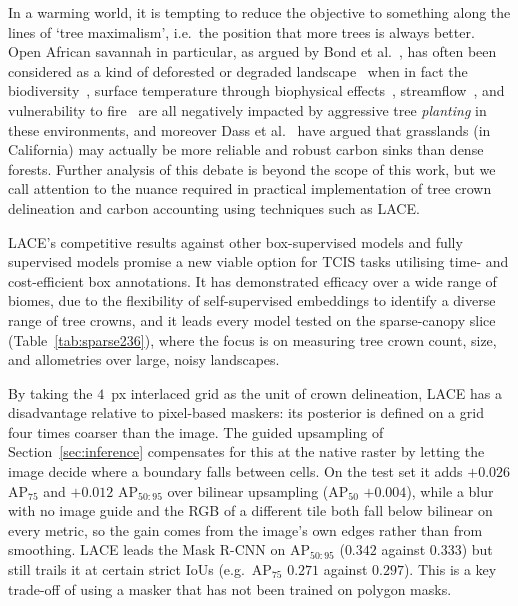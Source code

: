 \documentclass[remotesensing,article,submit,moreauthors]{Definitions/mdpi}
\begin{document}
In a warming world, it is tempting to reduce the objective to something along the lines of `tree maximalism', i.e.\ the position that more trees is always better. Open African savannah in particular, as argued by Bond et al.~\cite{bond2019}, has often been considered as a kind of deforested or degraded landscape~\cite{laestadius2012,bastin2019} when in fact the biodiversity~\cite{veldman2015,jenkins2013}, surface temperature through biophysical effects~\cite{bright2015}, streamflow~\cite{jackson2005}, and vulnerability to fire~\cite{veldman2015} are all negatively impacted by aggressive tree \emph{planting} in these environments, and moreover Dass et al.~\cite{dass2018} have argued that grasslands (in California) may actually be more reliable and robust carbon sinks than dense forests. Further analysis of this debate is beyond the scope of this work, but we call attention to the nuance required in practical implementation of tree crown delineation and carbon accounting using techniques such as LACE.

LACE's competitive results against other box-supervised models and fully supervised models promise a new viable option for TCIS tasks utilising time- and cost-efficient box annotations. It has demonstrated efficacy over a wide range of biomes, due to the flexibility of self-supervised embeddings to identify a diverse range of tree crowns, and it leads every model tested on the sparse-canopy slice (Table~\ref{tab:sparse236}), where the focus is on measuring tree crown count, size, and allometries over large, noisy landscapes. 

By taking the $4$~px interlaced grid as the unit of crown delineation, LACE has a disadvantage relative to pixel-based maskers: its posterior is defined on a grid four times coarser than the image. The guided upsampling of Section~\ref{sec:inference} compensates for this at the native raster by letting the image decide where a boundary falls between cells. On the test set it adds $+0.026$ AP$_{75}$ and $+0.012$ AP$_{50:95}$ over bilinear upsampling (AP$_{50}$ $+0.004$), while a blur with no image guide and the RGB of a different tile both fall below bilinear on every metric, so the gain comes from the image's own edges rather than from smoothing. LACE leads the Mask R-CNN on AP$_{50:95}$ ($0.342$ against $0.333$) but still trails it at certain strict IoUs (e.g.\ AP$_{75}$ $0.271$ against $0.297$). This is a key trade-off of using a masker that has not been trained on polygon masks.
\end{document}
